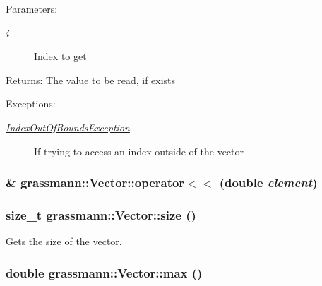 \begin{Desc}
\item[Parameters:]
\begin{description}
\item[{\em i}]Index to get \end{description}
\end{Desc}
\begin{Desc}
\item[Returns:]The value to be read, if exists \end{Desc}
\begin{Desc}
\item[Exceptions:]
\begin{description}
\item[{\em \hyperlink{classgrassmann_1_1IndexOutOfBoundsException}{IndexOutOfBoundsException}}]If trying to access an index outside of the vector \end{description}
\end{Desc}
\hypertarget{classgrassmann_1_1Vector_69966901d7ffcd3f0df9ffd37a637a1c}{
\subsubsection[operator$<$$<$]{\& grassmann::Vector::operator$<$$<$ (double {\em element})}}
\label{classgrassmann_1_1Vector_69966901d7ffcd3f0df9ffd37a637a1c}


\hypertarget{classgrassmann_1_1Vector_9ca025b6499bf75f21295c3fa49d03b4}{
\subsubsection[size]{\setlength{\rightskip}{0pt plus 5cm}size\_\-t grassmann::Vector::size ()}}
\label{classgrassmann_1_1Vector_9ca025b6499bf75f21295c3fa49d03b4}


Gets the size of the vector. 

\hypertarget{classgrassmann_1_1Vector_5b66d2b06688e0e4abfb7a2d62c73f35}{
\subsubsection[max]{\setlength{\rightskip}{0pt plus 5cm}double grassmann::Vector::max ()}}
\label{classgrassmann_1_1Vector_5b66d2b06688e0e4abfb7a2d62c73f35}


